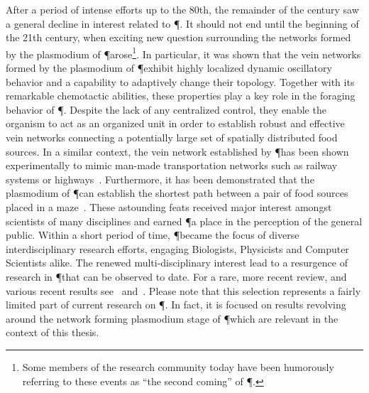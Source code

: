 		After a period of intense efforts up to the 80th, the remainder of the century saw a general decline in interest related to \P. It should not end until the beginning of the 21th century, when exciting new question surrounding the networks formed by the plasmodium of \P arose\footnote{Some members of the research community today have been humorously referring to these events as ``the second coming'' of \P.}. In particular, it was shown that the vein networks formed by the plasmodium of \P exhibit highly localized dynamic oscillatory behavior and a capability to adaptively change their topology. Together with its remarkable chemotactic abilities, these properties play a key role in the foraging behavior of \P. Despite the lack of any centralized control, they enable the organism to act as an organized unit in order to establish robust and effective vein networks connecting a potentially large set of spatially distributed food sources. In a similar context, the vein network established by \P has been shown experimentally to mimic man-made transportation networks such as railway systems or highways~\cite{tero2010rules,tero2006physarum,nakagaki2004smart}. Furthermore, it has been demonstrated that the plasmodium of \P can establish the shortest path between a pair of food sources placed in a maze~\cite{nakagaki2000intelligence}. These astounding feats received major interest amongst scientists of many disciplines and earned \P a place in the perception of the general public. Within a short period of time, \P became the focus of diverse interdisciplinary research efforts, engaging Biologists, Physicists and Computer Scientists alike. The renewed multi-disciplinary interest lead to a resurgence of research in \P that can be observed to date. For a rare, more recent review, and various recent results see~\cite{ueda2005intelligent} and~\cite{takamatsu2009environment,shirakawa2007emergence,alim2013random,tero2007mathematical,nakagaki2004obtaining}. Please note that this selection represents a fairly limited part of current research on \P. In fact, it is focused on results revolving around the network forming plasmodium stage of \P which are relevant in the context of this thesis.

		\FloatBarrier
